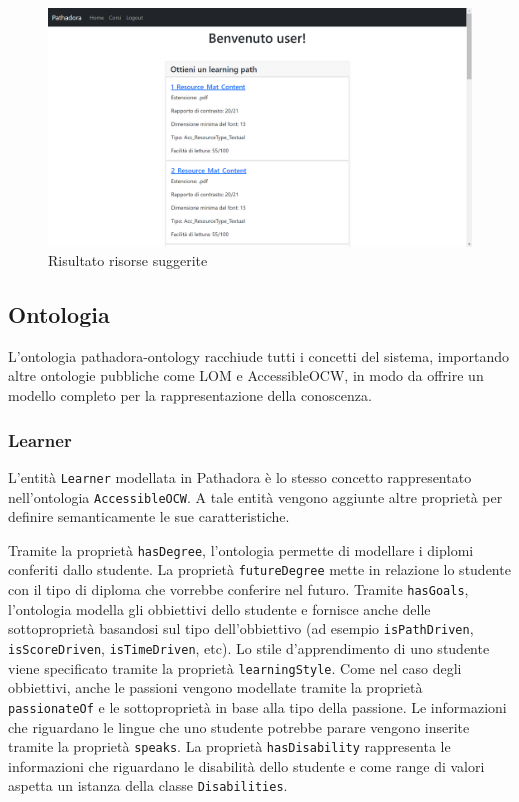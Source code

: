 \begin{figure}[H]
\centering
\includegraphics[scale=0.4]{res/path-result.png}
\caption{Risultato risorse suggerite}
\label{fig:resources-generation}
\end{figure}

\subsection{Ontologia}
L’ontologia pathadora-ontology racchiude tutti i concetti del sistema, importando altre ontologie pubbliche come LOM e AccessibleOCW, in modo da offrire un modello completo per la rappresentazione della conoscenza.

\subsubsection{Learner}
L'entità \texttt{Learner} modellata in Pathadora è lo stesso concetto rappresentato nell'ontologia \texttt{AccessibleOCW}. A tale entità vengono aggiunte altre proprietà per definire semanticamente le sue caratteristiche.

Tramite la proprietà \texttt{hasDegree}, l'ontologia permette di modellare i diplomi conferiti dallo studente. La proprietà \texttt{futureDegree} mette in relazione lo studente con il tipo di diploma che vorrebbe conferire nel futuro. Tramite \texttt{hasGoals}, l'ontologia modella gli obbiettivi dello studente e fornisce anche delle sottoproprietà basandosi sul tipo dell'obbiettivo (ad esempio \texttt{isPathDriven}, \texttt{isScoreDriven}, \texttt{isTimeDriven}, etc). Lo stile d'apprendimento di uno studente viene specificato tramite la proprietà \texttt{learningStyle}. Come nel caso degli obbiettivi, anche le passioni vengono modellate tramite la proprietà \texttt{passionateOf} e le sottoproprietà in base alla tipo della passione. Le informazioni che riguardano le lingue che uno studente potrebbe parare vengono inserite tramite la proprietà \texttt{speaks}.
La proprietà \texttt{hasDisability} rappresenta le informazioni che riguardano le disabilità dello studente e come range di valori aspetta un istanza della classe \texttt{Disabilities}.

